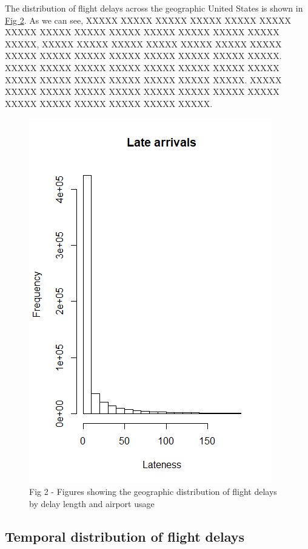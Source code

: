 \documentclass[12pt, a4paper]{book}
\newcommand\tab[1][1cm]{\hspace*{#1}}
\begin{document}
			\tab The distribution of flight delays across the geographic United States is shown in \underline{Fig 2}. As we can see, XXXXX XXXXX XXXXX XXXXX XXXXX XXXXX XXXXX XXXXX XXXXX XXXXX XXXXX XXXXX XXXXX XXXXX XXXXX, XXXXX XXXXX XXXXX XXXXX XXXXX XXXXX XXXXX XXXXX XXXXX XXXXX XXXXX XXXXX XXXXX XXXXX XXXXX. XXXXX XXXXX XXXXX XXXXX XXXXX XXXXX XXXXX XXXXX XXXXX XXXXX XXXXX XXXXX XXXXX XXXXX XXXXX. XXXXX XXXXX XXXXX XXXXX XXXXX XXXXX XXXXX XXXXX XXXXX XXXXX XXXXX XXXXX XXXXX XXXXX XXXXX.\\
			\begin{figure}
			\centering
	 		\includegraphics[width = .45 \textwidth]{../figures/LateArrivalsHistogram}
	 		\caption{Fig 2 - Figures showing the geographic distribution of flight delays by delay length and airport usage}
	 		\end{figure}
	 		
		\subsection{Temporal distribution of flight delays}
		
\end{document}
